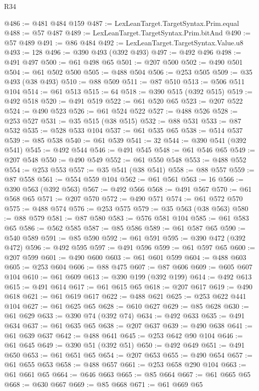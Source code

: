 \begin{lexlean}{R34}
\begin{coremodule}
@486 := @481 @484 @159
@487 := LexLeanTarget.TargetSyntax.Prim.equal
@488 := @57 @487
@489 := LexLeanTarget.TargetSyntax.Prim.bitAnd
@490 := @57 @489
@491 := @86 @484
@492 := LexLeanTarget.TargetSyntax.Value.u8
@493 := 128
@496 := @390 @493 (@392 @493)
@497 := @492 @496
@498 := @491 @497
@500 := @61 @498 @65
@501 := @207 @500
@502 := @490 @501
@504 := @61 @502 @500
@505 := @488 @504
@506 := @253 @505
@509 := @35 @493 (@38 @493)
@510 := @88 @509
@511 := @87 @510
@513 := @506 @511 @104
@514 := @61 @513
@515 := 64
@518 := @390 @515 (@392 @515)
@519 := @492 @518
@520 := @491 @519
@522 := @61 @520 @65
@523 := @207 @522
@524 := @490 @523
@526 := @61 @524 @522
@527 := @488 @526
@528 := @253 @527
@531 := @35 @515 (@38 @515)
@532 := @88 @531
@533 := @87 @532
@535 := @528 @533 @104
@537 := @61 @535 @65
@538 := @514 @537
@539 := @85 @538
@540 := @61 @539
@541 := 32
@544 := @390 @541 (@392 @541)
@545 := @492 @544
@546 := @491 @545
@548 := @61 @546 @65
@549 := @207 @548
@550 := @490 @549
@552 := @61 @550 @548
@553 := @488 @552
@554 := @253 @553
@557 := @35 @541 (@38 @541)
@558 := @88 @557
@559 := @87 @558
@561 := @554 @559 @104
@562 := @61 @561
@563 := 16
@566 := @390 @563 (@392 @563)
@567 := @492 @566
@568 := @491 @567
@570 := @61 @568 @65
@571 := @207 @570
@572 := @490 @571
@574 := @61 @572 @570
@575 := @488 @574
@576 := @253 @575
@579 := @35 @563 (@38 @563)
@580 := @88 @579
@581 := @87 @580
@583 := @576 @581 @104
@585 := @61 @583 @65
@586 := @562 @585
@587 := @85 @586
@589 := @61 @587 @65
@590 := @540 @589
@591 := @85 @590
@592 := @61 @591
@595 := @390 @472 (@392 @472)
@596 := @492 @595
@597 := @491 @596
@599 := @61 @597 @65
@600 := @207 @599
@601 := @490 @600
@603 := @61 @601 @599
@604 := @488 @603
@605 := @253 @604
@606 := @88 @475
@607 := @87 @606
@609 := @605 @607 @104
@610 := @61 @609
@613 := @390 @199 (@392 @199)
@614 := @492 @613
@615 := @491 @614
@617 := @61 @615 @65
@618 := @207 @617
@619 := @490 @618
@621 := @61 @619 @617
@622 := @488 @621
@625 := @253 @622 @441 @104
@627 := @61 @625 @65
@628 := @610 @627
@629 := @85 @628
@630 := @61 @629
@633 := @390 @74 (@392 @74)
@634 := @492 @633
@635 := @491 @634
@637 := @61 @635 @65
@638 := @207 @637
@639 := @490 @638
@641 := @61 @639 @637
@642 := @488 @641
@645 := @253 @642 @90 @104
@646 := @61 @645
@649 := @390 @51 (@392 @51)
@650 := @492 @649
@651 := @491 @650
@653 := @61 @651 @65
@654 := @207 @653
@655 := @490 @654
@657 := @61 @655 @653
@658 := @488 @657
@661 := @253 @658 @290 @104
@663 := @61 @661 @65
@664 := @646 @663
@665 := @85 @664
@667 := @61 @665 @65
@668 := @630 @667
@669 := @85 @668
@671 := @61 @669 @65

\end{coremodule}
\end{lexlean}
